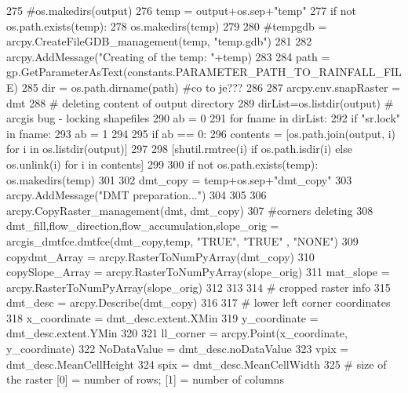 \begin{DoxyCode}
{}
275   \textcolor{comment}{#os.makedirs(output)
}
276   temp = output+os.sep+\textcolor{stringliteral}{"temp"}
277   \textcolor{keywordflow}{if} \textcolor{keywordflow}{not} os.path.exists(temp):
278       os.makedirs(temp)
279 
280   \textcolor{comment}{#tempgdb  = arcpy.CreateFileGDB\_management(temp, "temp.gdb")
}
281 
282   arcpy.AddMessage(\textcolor{stringliteral}{"Creating of the temp: "}+temp)
283 
284   path = gp.GetParameterAsText(constants.PARAMETER\_PATH\_TO\_RAINFALL\_FILE)
285   dir = os.path.dirname(path) \textcolor{comment}{#co to je???
}
286 
287   arcpy.env.snapRaster = dmt
288   \textcolor{comment}{# deleting content of output directory
}
289   dirList=os.listdir(output) \textcolor{comment}{# arcgis bug - locking shapefiles
}
290   ab = 0
291   \textcolor{keywordflow}{for} fname \textcolor{keywordflow}{in} dirList:
292       \textcolor{keywordflow}{if} \textcolor{stringliteral}{"sr.lock"} \textcolor{keywordflow}{in} fname:
293        ab = 1
294 
295   \textcolor{keywordflow}{if} ab == 0:
296       contents = [os.path.join(output, i) \textcolor{keywordflow}{for} i \textcolor{keywordflow}{in} os.listdir(output)]
297 
298       [shutil.rmtree(i) \textcolor{keywordflow}{if} os.path.isdir(i) \textcolor{keywordflow}{else} os.unlink(i) \textcolor{keywordflow}{for} i \textcolor{keywordflow}{in} contents]
299 
300   \textcolor{keywordflow}{if} \textcolor{keywordflow}{not} os.path.exists(temp): os.makedirs(temp)
301 
302   dmt\_copy = temp+os.sep+\textcolor{stringliteral}{"dmt\_copy"}
303   arcpy.AddMessage(\textcolor{stringliteral}{"DMT preparation..."})
304 
305 
306   arcpy.CopyRaster\_management(dmt, dmt\_copy)
307   \textcolor{comment}{#corners deleting
}
308   dmt\_fill,flow\_direction,flow\_accumulation,slope\_orig = arcgis\_dmtfce.dmtfce(dmt\_copy,temp, \textcolor{stringliteral}{"TRUE"}, \textcolor{stringliteral}{"TRUE"}
      , \textcolor{stringliteral}{"NONE"})
309   copydmt\_Array = arcpy.RasterToNumPyArray(dmt\_copy)
310   copySlope\_Array = arcpy.RasterToNumPyArray(slope\_orig)
311   mat\_slope = arcpy.RasterToNumPyArray(slope\_orig)
312 
313 
314   \textcolor{comment}{# cropped raster info
}
315   dmt\_desc = arcpy.Describe(dmt\_copy)
316 
317   \textcolor{comment}{# lower left corner coordinates
}
318   x\_coordinate = dmt\_desc.extent.XMin
319   y\_coordinate = dmt\_desc.extent.YMin
320 
321   ll\_corner = arcpy.Point(x\_coordinate, y\_coordinate)
322   NoDataValue = dmt\_desc.noDataValue
323   vpix = dmt\_desc.MeanCellHeight
324   spix = dmt\_desc.MeanCellWidth
325   \textcolor{comment}{# size of the raster [0] = number of rows; [1] = number of columns
}
\end{DoxyCode}
